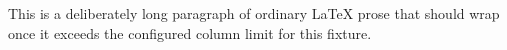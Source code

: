 This is a deliberately long paragraph of
ordinary LaTeX prose that should wrap
once it exceeds the configured column
limit for this fixture.
